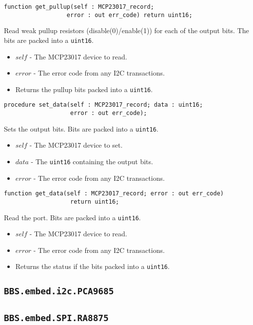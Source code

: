 \documentclass[10pt, openany]{book}
\newcommand{\package}[1]{\texttt{#1}}
\newcommand{\datatype}[1]{\texttt{#1}}
\begin{document}
\begin{lstlisting}
function get_pullup(self : MCP23017_record;
                  error : out err_code) return uint16;
\end{lstlisting}
Read weak pullup resistors (disable(0)/enable(1)) for each of the output bits.  The bits are packed into a \datatype{uint16}.
\begin{itemize}
  \item $self$ - The MCP23017 device to read.
  \item $error$ - The error code from any I2C transactions.
  \item Returns the pullup bits packed into a \datatype{uint16}.
\end{itemize}

\begin{lstlisting}
procedure set_data(self : MCP23017_record; data : uint16;
                   error : out err_code);
\end{lstlisting}
Sets the output bits.  Bits are packed into a \datatype{uint16}.
\begin{itemize}
  \item $self$ - The MCP23017 device to set.
  \item $data$ - The \datatype{uint16} containing the output bits.
  \item $error$ - The error code from any I2C transactions.
\end{itemize}

\begin{lstlisting}
function get_data(self : MCP23017_record; error : out err_code)
                   return uint16;
\end{lstlisting}
Read the port.  Bits are packed into a \datatype{uint16}.
\begin{itemize}
  \item $self$ - The MCP23017 device to read.
  \item $error$ - The error code from any I2C transactions.
  \item Returns the status if the bits packed into a \datatype{uint16}.
\end{itemize}

\subsection{\package{BBS.embed.i2c.PCA9685}}

\subsection{\package{BBS.embed.SPI.RA8875}}
\end{document}
